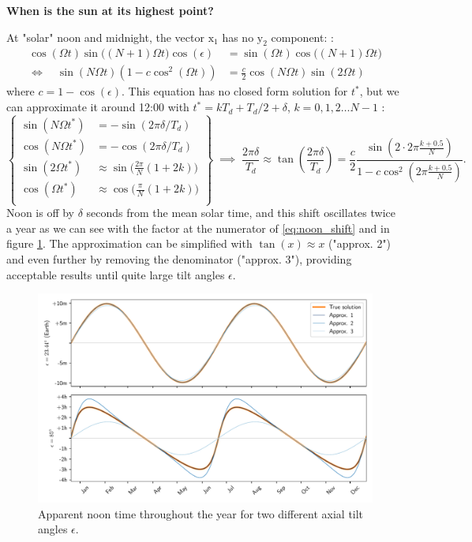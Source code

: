 \documentclass[12pt]{article}
\begin{document}
\textbf{When is the sun at its highest point?}

At "solar" noon and midnight, the vector $\mathrm{x}_1$ has no $\mathrm{y}_2$ component:
:
\begin{equation}
    \begin{aligned}
        \cos(\Omega t)\sin\big((N+1)\Omega t\big) \cos(\epsilon) &= \sin(\Omega t) \cos\big((N+1)\Omega t\big)\\
        \iff \quad \sin(N\Omega t)(1-c \cos^2(\Omega t)) &= \frac{c}{2} \cos(N\Omega t) \sin(2\Omega t)
    \end{aligned}
\end{equation}
where $c=1-\cos(\epsilon)$. This equation has no closed form solution for $t^*$,
but we can approximate it around 12:00 with $t^*=kT_d+T_d/2+\delta$, $k=0,1,2\ldots N-1$
:
\begin{equation}
    \left\{
        \begin{aligned}
            \sin(N\Omega t^*) &= -\sin(2\pi\delta / T_d)\\
            \cos(N\Omega t^*) &= -\cos(2\pi\delta / T_d)\\
            \sin(2\Omega t^*) &\approx \sin\big(\tfrac{2\pi}{N} (1+2k)\big)\\
            \cos(\Omega t^*) &\approx \cos\big(\tfrac{\:\pi\:}{N} (1+2k)\big)\\
        \end{aligned}
    \right\} \; \implies \;
    \frac{2\pi \delta}{T_d} \approx \tan(\frac{2\pi \delta}{T_d}) = 
    \frac{c}{2} \frac{\sin(2\cdot 2\pi \tfrac{k+0.5}{N})}{1-c \cos^2(2\pi \tfrac{k+0.5}{N})}.
    \label{eq:noon_shift}
\end{equation}
Noon is off by $\delta$ seconds from the mean solar time, and this shift
oscillates twice a year as we can see with the factor at the numerator of 
\eqref{eq:noon_shift} and in figure \ref{fig:noon_shift}. 
The approximation can be simplified with $\tan(x) \approx x$ 
("approx. 2") and even further by removing the denominator ("approx. 3"),
providing acceptable results until quite large tilt angles $\epsilon$.

\begin{figure}[ht]
    \centering
    \includegraphics[width=\textwidth]{./noon_computed.pdf}
    \caption{
        Apparent noon time throughout the year for two different axial tilt angles $\epsilon$.
    }
    \label{fig:noon_shift}
\end{figure}
\end{document}
